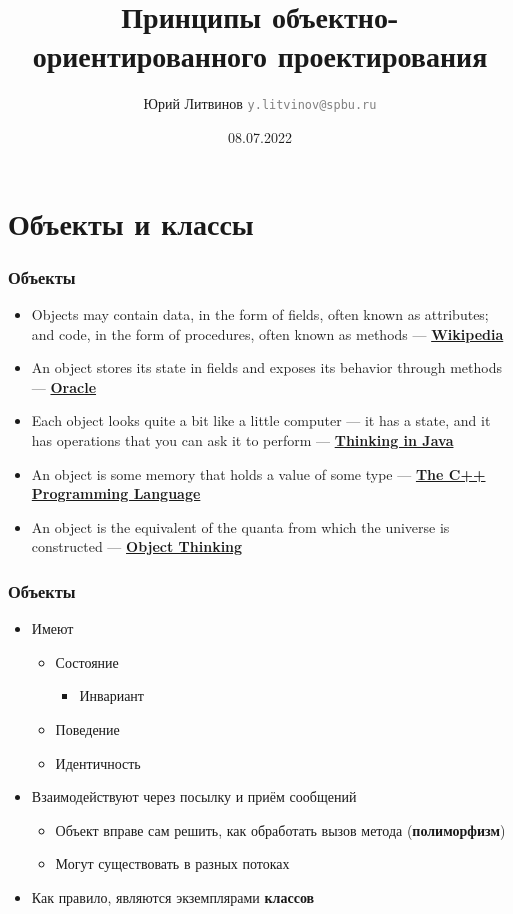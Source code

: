 \documentclass[xetex,mathserif,serif]{beamer}
\title{Принципы объектно-ориентированного проектирования}
\author[Юрий Литвинов]{Юрий Литвинов \newline \textcolor{gray}{\small\texttt{y.litvinov@spbu.ru}}}
\date{08.07.2022}
\begin{document}
    
    \frame{\titlepage}

    \section{Объекты и классы}

    \begin{frame}
        \frametitle{Объекты}
        \begin{itemize}
            \item Objects may contain data, in the form of fields, often known as attributes; and code, in the form of procedures, often known as methods --- \textbf{\href{https://en.wikipedia.org/wiki/Object-oriented\_programming}{Wikipedia}}
            \item An object stores its state in fields and exposes its behavior through methods --- \textbf{\href{https://docs.oracle.com/javase/tutorial/java/concepts/object.html}{Oracle}}
            \item Each object looks quite a bit like a little computer --- it has a state, and it has operations that you can ask it to perform --- \textbf{\href{http://amzn.to/1PBmQpm}{Thinking in Java}}
            \item An object is some memory that holds a value of some type --- \textbf{\href{http://amzn.to/1XyGCtk}{The C++ Programming Language}}
            \item An object is the equivalent of the quanta from which the universe is constructed --- \textbf{\href{http://amzn.to/266oJr4}{Object Thinking}}
        \end{itemize}
    \end{frame}

    \begin{frame}
        \frametitle{Объекты}
        \begin{itemize}
            \item Имеют
            \begin{itemize}
                \item Состояние
                \begin{itemize}
                    \item Инвариант
                \end{itemize}
                \item Поведение
                \item Идентичность
            \end{itemize}
            \item Взаимодействуют через посылку и приём сообщений
            \begin{itemize}
                \item Объект вправе сам решить, как обработать вызов метода (\textbf{полиморфизм})
                \item Могут существовать в разных потоках
            \end{itemize}
            \item Как правило, являются экземплярами \textbf{классов}
        \end{itemize}
    \end{frame}
\end{document}
